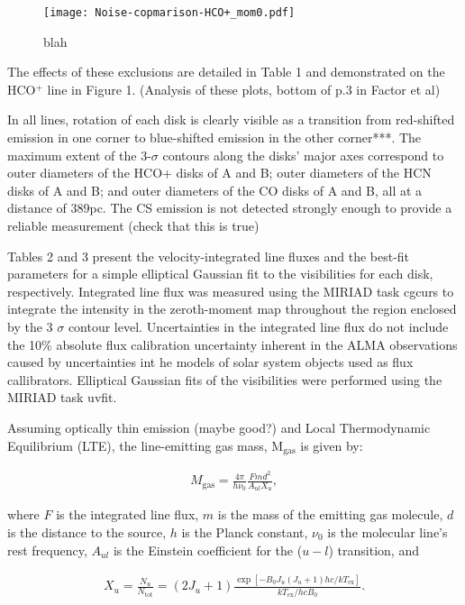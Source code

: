 \begin{figure}
  \centering
  \texttt{[image: Noise-copmarison-HCO+\_mom0.pdf]}
  \caption{blah}
\end{figure}

The effects of these exclusions are detailed in Table 1 and demonstrated on the HCO$^{+}$ line in Figure 1. (Analysis of these plots, bottom of p.3 in Factor et al)


In all lines, rotation of each disk is clearly visible as a transition from red-shifted emission in one corner to blue-shifted emission in the other corner***. The maximum extent of the 3-$\sigma$ contours along the disks' major axes correspond to outer diameters of the HCO+ disks of A and B; outer diameters of the HCN disks of A and B; and outer diameters of the CO disks of A and B, all at a distance of 389pc. The CS emission is not detected strongly enough to provide a reliable measurement (check that this is true)

Tables 2 and 3 present the velocity-integrated line fluxes and the best-fit parameters for a simple elliptical Gaussian fit to the visibilities for each disk, respectively. Integrated line flux was measured using the MIRIAD task cgcurs to integrate the intensity in the zeroth-moment map throughout the region enclosed by the 3 $\sigma$ contour level. Uncertainties in the integrated line flux do not include the 10\% absolute flux calibration uncertainty inherent in the ALMA observations caused by uncertainties int he models of solar system objects used as flux callibrators. Elliptical Gaussian fits of the visibilities were performed using the MIRIAD task uvfit.

Assuming optically thin emission (maybe good?) and Local Thermodynamic Equilibrium (LTE), the line-emitting gas mass, M$_{\text{gas}}$ is given by:

\begin{align}
  M_{\text{gas}}= \frac{4 \pi}{h \nu_0} \frac{F m d^2}{A_{ul} X_u},
\end{align}

where $F$ is the integrated line flux, $m$ is the mass of the emitting gas molecule, $d$ is the distance to the source, $h$ is the Planck constant, $\nu_0$ is the molecular line's rest frequency, $A_{ul}$ is the Einstein coefficient for the ($u - l$) transition, and

\begin{align}
  X_u = \frac{N_u}{N_{\text{tot}}} = (2 J_u + 1) \frac{\exp [-B_0 J_u (J_u + 1) h c/kT_{\text{ex}}]}{kT_{\text{ex}}/hc B_0}.
\end{align}

